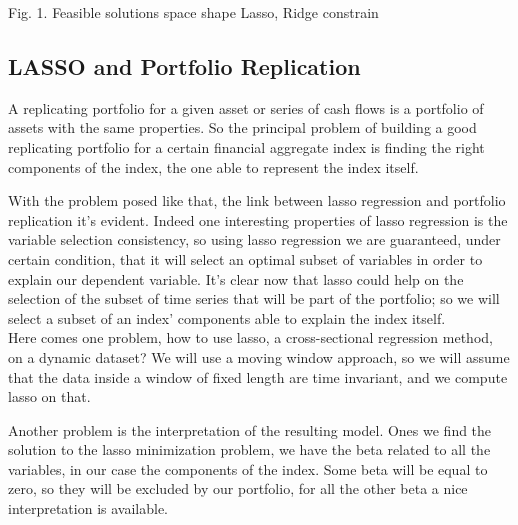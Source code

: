 \documentclass{article}%
\begin{document}
\begin{center}
\begin{small}
Fig. 1. Feasible solutions space shape Lasso, Ridge constrain
\end{small}
\end{center}

\subsection{LASSO and Portfolio Replication}

A replicating portfolio for a given asset or series of cash flows is a portfolio of assets with the same properties. So the principal problem of building a good replicating portfolio for a certain financial aggregate index is finding the right components of the index, the one able to represent the index itself. 

With the problem posed like that, the link between lasso regression and portfolio replication it's evident. Indeed one interesting properties of lasso regression is the variable selection consistency, so using lasso regression we are guaranteed, under certain condition, that it will select an optimal subset of variables in order to explain our dependent variable. It's clear now that lasso could help on the selection of the subset of time series that will be part of the portfolio; so we will select a subset of an index' components  able to explain the index itself.
\\

Here comes one problem, how to use lasso, a cross-sectional regression method, on a dynamic dataset? We will use a moving window approach, so we will assume that the data inside a window of fixed length are time invariant, and we compute lasso on that.

Another problem is the interpretation of the resulting model. Ones we find the solution to the lasso minimization problem, we have the beta related to all the variables, in our case the components of the index. Some beta will be equal to zero, so they will be excluded by our portfolio, for all the other beta a nice interpretation is available. 
\end{document}
